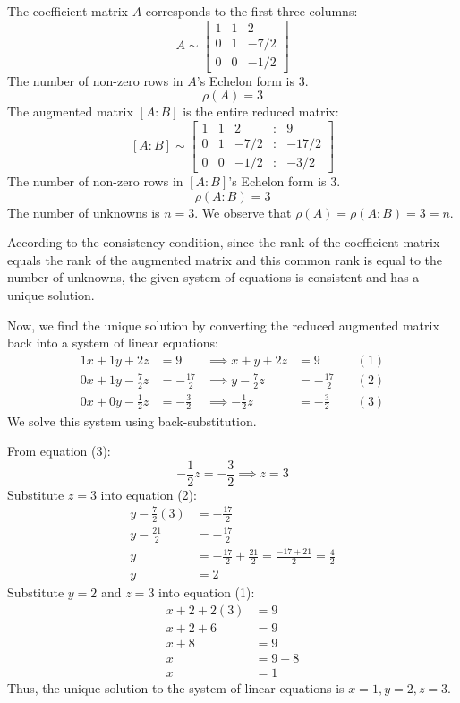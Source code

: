 \documentclass{article}
\begin{document}
The coefficient matrix $A$ corresponds to the first three columns:
\[ A \sim \begin{bmatrix} 1 & 1 & 2 \\ 0 & 1 & -7/2 \\ 0 & 0 & -1/2 \end{bmatrix} \]
The number of non-zero rows in $A$'s Echelon form is 3.
\[ \rho(A) = 3 \]
The augmented matrix $[A:B]$ is the entire reduced matrix:
\[ [A:B] \sim \begin{bmatrix} 1 & 1 & 2 & : & 9 \\ 0 & 1 & -7/2 & : & -17/2 \\ 0 & 0 & -1/2 & : & -3/2 \end{bmatrix} \]
The number of non-zero rows in $[A:B]$'s Echelon form is 3.
\[ \rho(A:B) = 3 \]
The number of unknowns is $n=3$.
We observe that $\rho(A) = \rho(A:B) = 3 = n$.

According to the consistency condition, since the rank of the coefficient matrix equals the rank of the augmented matrix and this common rank is equal to the number of unknowns, the given system of equations is consistent and has a unique solution.

Now, we find the unique solution by converting the reduced augmented matrix back into a system of linear equations:
\begin{align*} 1x + 1y + 2z &= 9 &\implies x + y + 2z &= 9 \quad &(1) \\ 0x + 1y - \frac{7}{2}z &= -\frac{17}{2} &\implies y - \frac{7}{2}z &= -\frac{17}{2} \quad &(2) \\ 0x + 0y - \frac{1}{2}z &= -\frac{3}{2} &\implies -\frac{1}{2}z &= -\frac{3}{2} \quad &(3) \end{align*}
We solve this system using back-substitution.

From equation (3):
\[ -\frac{1}{2}z = -\frac{3}{2} \implies z = 3 \]
Substitute $z=3$ into equation (2):
\begin{align*} y - \frac{7}{2}(3) &= -\frac{17}{2} \\ y - \frac{21}{2} &= -\frac{17}{2} \\ y &= -\frac{17}{2} + \frac{21}{2} = \frac{-17 + 21}{2} = \frac{4}{2} \\ y &= 2 \end{align*}
Substitute $y=2$ and $z=3$ into equation (1):
\begin{align*} x + 2 + 2(3) &= 9 \\ x + 2 + 6 &= 9 \\ x + 8 &= 9 \\ x &= 9 - 8 \\ x &= 1 \end{align*}
Thus, the unique solution to the system of linear equations is $x=1, y=2, z=3$.
\end{document}
